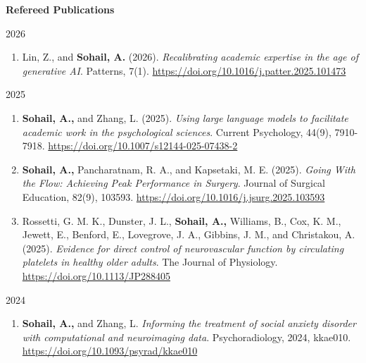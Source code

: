 \setcounter{papercount}{0}

\textbf{Refereed Publications}
\vspace{1em}

{2026}
\begin{enumerate}[]

\item Lin, Z., and \textbf{Sohail, A.} (2026). \textit{Recalibrating academic expertise in the age of generative AI}. Patterns, 7(1). \href{https://doi.org/10.1016/j.patter.2025.101473}{https://doi.org/10.1016/j.patter.2025.101473}

\end{enumerate}

{2025}
\begin{enumerate}[]

\item \textbf{Sohail, A.,} and Zhang, L. (2025). \textit{Using large language models to facilitate academic work in the psychological sciences}. Current Psychology, 44(9), 7910-7918. \href{https://doi.org/10.1007/s12144-025-07438-2}{https://doi.org/10.1007/s12144-025-07438-2}

\item \textbf{Sohail, A.,} Pancharatnam, R. A., and Kapsetaki, M. E. (2025). \textit{Going With the Flow: Achieving Peak Performance in Surgery}. Journal of Surgical Education, 82(9), 103593. \href{https://doi.org/10.1016/j.jsurg.2025.103593}{https://doi.org/10.1016/j.jsurg.2025.103593}

\item Rossetti, G. M. K., Dunster, J. L., \textbf{Sohail, A.,} Williams, B., Cox, K. M., Jewett, E., Benford, E., Lovegrove, J. A., Gibbins, J. M., and Christakou, A. (2025). \textit{Evidence for direct control of neurovascular function by circulating platelets in healthy older adults}. The Journal of Physiology. \href{https://doi.org/10.1113/JP288405}{https://doi.org/10.1113/JP288405}

\end{enumerate}

\vspace{0.5em}

{2024}
\begin{enumerate}[]

\item \textbf{Sohail, A.,} and Zhang, L. \textit{Informing the treatment of social anxiety disorder with computational and neuroimaging data}. Psychoradiology, 2024, kkae010. \href{https://doi.org/10.1093/psyrad/kkae010}{https://doi.org/10.1093/psyrad/kkae010}

\end{enumerate}

